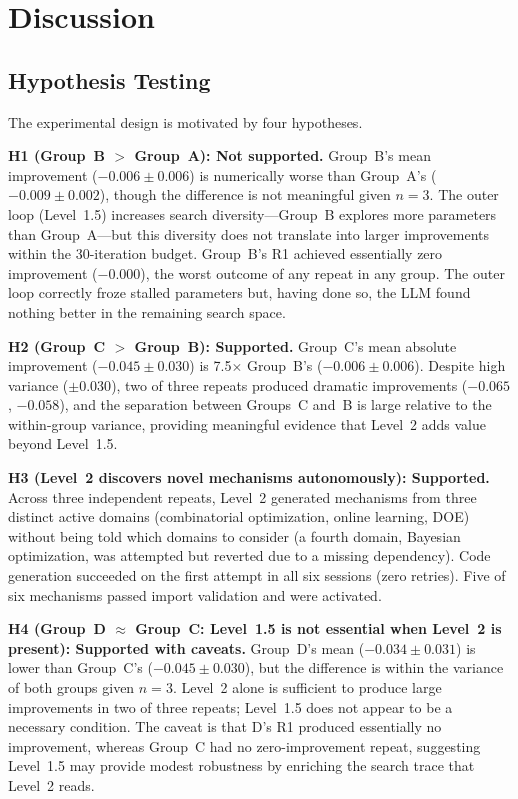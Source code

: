 \section{Discussion}
\label{sec:discussion}

\subsection{Hypothesis Testing}

The experimental design is motivated by four hypotheses.

\textbf{H1 (Group~B $>$ Group~A): Not supported.}
Group~B's mean improvement ($-0.006 \pm 0.006$) is numerically worse than
Group~A's ($-0.009 \pm 0.002$), though the difference is not meaningful given
$n=3$.
The outer loop (Level~1.5) increases search diversity---Group~B explores more
parameters than Group~A---but this diversity does not translate into larger
improvements within the 30-iteration budget.
Group~B's R1 achieved essentially zero improvement ($-0.000$), the worst
outcome of any repeat in any group.
The outer loop correctly froze stalled parameters but, having done so, the LLM
found nothing better in the remaining search space.

\textbf{H2 (Group~C $>$ Group~B): Supported.}
Group~C's mean absolute improvement ($-0.045 \pm 0.030$) is 7.5$\times$
Group~B's ($-0.006 \pm 0.006$).
Despite high variance ($\pm 0.030$), two of three repeats produced dramatic
improvements ($-0.065$, $-0.058$), and the separation between Groups~C and~B
is large relative to the within-group variance, providing meaningful evidence
that Level~2 adds value beyond Level~1.5.

\textbf{H3 (Level~2 discovers novel mechanisms autonomously): Supported.}
Across three independent repeats, Level~2 generated mechanisms from three
distinct active domains (combinatorial optimization, online learning, DOE)
without being told which domains to consider (a fourth domain, Bayesian
optimization, was attempted but reverted due to a missing dependency).
Code generation succeeded on the first attempt in all six sessions (zero
retries).
Five of six mechanisms passed import validation and were activated.

\textbf{H4 (Group~D $\approx$ Group~C: Level~1.5 is not essential when Level~2 is present): Supported with caveats.}
Group~D's mean ($-0.034 \pm 0.031$) is lower than Group~C's ($-0.045 \pm 0.030$),
but the difference is within the variance of both groups given $n=3$.
Level~2 alone is sufficient to produce large improvements in two of three
repeats; Level~1.5 does not appear to be a necessary condition.
The caveat is that D's R1 produced essentially no improvement, whereas
Group~C had no zero-improvement repeat, suggesting Level~1.5 may provide
modest robustness by enriching the search trace that Level~2 reads.

